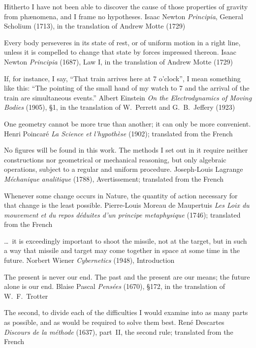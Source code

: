   {Hitherto I have not been able to discover the cause of those properties of gravity from
   ph\ae nomena, and I frame no hypotheses.}
  {Isaac Newton}
  {\emph{Principia}, General Scholium (1713), in the translation of Andrew Motte (1729)}

  {Every body perseveres in its state of rest, or of uniform motion in a right line, unless it is
   compelled to change that state by forces impressed thereon.}
  {Isaac Newton}
  {\emph{Principia} (1687), Law I, in the translation of Andrew Motte (1729)}

  {If, for instance, I say, \enquote{That train arrives here at 7 o'clock}, I mean something like
   this: \enquote{The pointing of the small hand of my watch to 7 and the arrival of the train are
   simultaneous events.}}
  {Albert Einstein}
  {\emph{On the Electrodynamics of Moving Bodies} (1905), §1, in the translation of W.~Perrett and
   G.~B.~Jeffery (1923)}

  {One geometry cannot be more true than another; it can only be more convenient.}
  {Henri Poincaré}
  {\emph{La Science et l'hypothèse} (1902); translated from the French}

  {No figures will be found in this work. The methods I set out in it require neither
   constructions nor geometrical or mechanical reasoning, but only algebraic operations, subject to
   a regular and uniform procedure.}
  {Joseph-Louis Lagrange}
  {\emph{Méchanique analitique} (1788), Avertissement; translated from the French}

  {Whenever some change occurs in Nature, the quantity of action necessary for that change is the
   least possible.}
  {Pierre-Louis Moreau de Maupertuis}
  {\emph{Les Loix du mouvement et du repos déduites d'un principe metaphysique} (1746); translated
   from the French}

  {\ldots\ it is exceedingly important to shoot the missile, not at the target, but in such a way
   that missile and target may come together in space at some time in the future.}
  {Norbert Wiener}
  {\emph{Cybernetics} (1948), Introduction}

  {The present is never our end. The past and the present are our means; the future alone is our
   end.}
  {Blaise Pascal}
  {\emph{Pensées} (1670), §172, in the translation of W.~F.~Trotter}

  {The second, to divide each of the difficulties I would examine into as many parts as possible,
   and as would be required to solve them best.}
  {René Descartes}
  {\emph{Discours de la méthode} (1637), part~II, the second rule; translated from the French}

